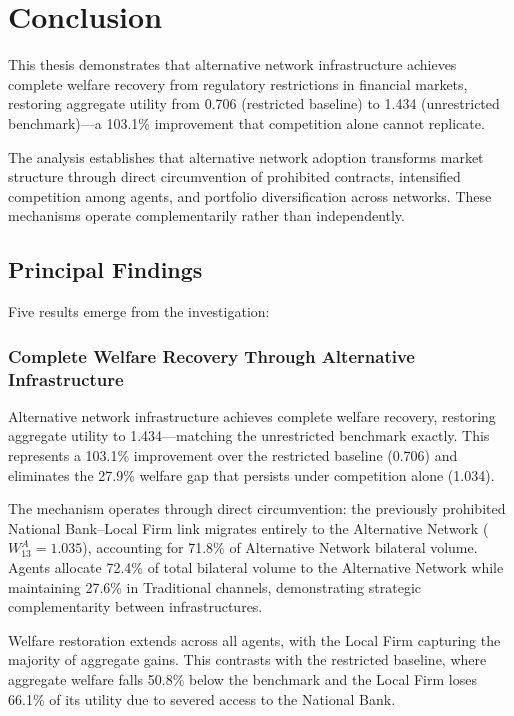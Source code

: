 \chapter{Conclusion}
\label{chap:conclusion}

This thesis demonstrates that alternative network infrastructure achieves complete welfare recovery from regulatory restrictions in financial markets, restoring aggregate utility from 0.706 (restricted baseline) to 1.434 (unrestricted benchmark)—a 103.1\% improvement that competition alone cannot replicate.

The analysis establishes that alternative network adoption transforms market structure through direct circumvention of prohibited contracts, intensified competition among agents, and portfolio diversification across networks. These mechanisms operate complementarily rather than independently.

\section{Principal Findings}

Five results emerge from the investigation:

\subsection{Complete Welfare Recovery Through Alternative Infrastructure}

Alternative network infrastructure achieves complete welfare recovery, restoring aggregate utility to 1.434—matching the unrestricted benchmark exactly. This represents a 103.1\% improvement over the restricted baseline (0.706) and eliminates the 27.9\% welfare gap that persists under competition alone (1.034).

The mechanism operates through direct circumvention: the previously prohibited National Bank–Local Firm link migrates entirely to the Alternative Network ($W_{13}^A = 1.035$), accounting for 71.8\% of Alternative Network bilateral volume. Agents allocate 72.4\% of total bilateral volume to the Alternative Network while maintaining 27.6\% in Traditional channels, demonstrating strategic complementarity between infrastructures.

Welfare restoration extends across all agents, with the Local Firm capturing the majority of aggregate gains. This contrasts with the restricted baseline, where aggregate welfare falls 50.8\% below the benchmark and the Local Firm loses 66.1\% of its utility due to severed access to the National Bank.

